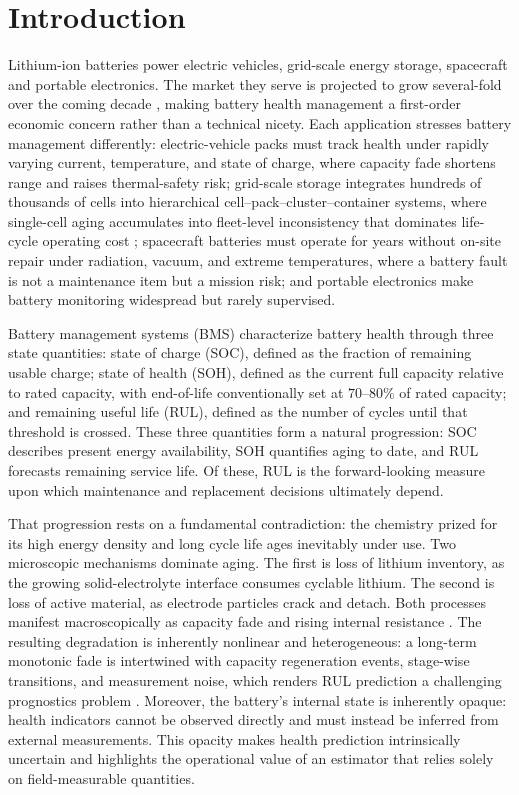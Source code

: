 \documentclass[final,5p,times,twocolumn]{elsarticle}
\begin{document}
\section{Introduction}
\label{sec:intro}

Lithium-ion batteries power electric vehicles, grid-scale energy storage,
 spacecraft and portable electronics. The market they serve is projected 
 to grow several-fold over the coming decade
\cite{ref_yang_review}, making battery health
management a first-order economic concern rather than a technical
nicety. Each application stresses battery management differently:
electric-vehicle packs must track health under rapidly varying
current, temperature, and state of charge, where capacity fade
shortens range and raises thermal-safety risk; grid-scale storage
integrates hundreds of thousands of cells into hierarchical
cell--pack--cluster--container systems, where single-cell aging
accumulates into fleet-level inconsistency that dominates life-cycle
operating cost \cite{ref_qu_bess}; spacecraft batteries must operate
for years without on-site repair under radiation, vacuum, and
extreme temperatures, where a battery fault is not a maintenance
item but a mission risk; and portable electronics
make battery monitoring widespread but rarely supervised.

Battery management systems (BMS) characterize battery health through three state quantities: 
state of charge (SOC), defined as the fraction of remaining usable charge; 
state of health (SOH), defined as the current full capacity relative to rated capacity, 
with end-of-life conventionally set at $70$--$80\%$ of rated capacity; and remaining useful life (RUL),
defined as the number of cycles until that threshold is crossed. 
These three quantities form a natural progression: SOC describes present energy availability, 
SOH quantifies aging to date, and RUL forecasts remaining service life. 
Of these, RUL is the forward-looking measure upon which maintenance and 
replacement decisions ultimately depend.

That progression rests on a fundamental contradiction: the chemistry
prized for its high energy density and long cycle life ages
inevitably under use. Two microscopic mechanisms dominate aging. 
The first is loss of lithium inventory, as the growing solid-electrolyte interface consumes cyclable lithium. 
The second is loss of active material, as electrode particles crack and detach. 
Both processes manifest macroscopically as capacity fade and rising internal resistance
\cite{ref_yang_review}. The resulting degradation is inherently nonlinear and heterogeneous: 
a long-term monotonic fade is intertwined with capacity regeneration events, stage-wise transitions, 
and measurement noise, which renders RUL prediction a challenging prognostics problem \cite{ref_rulmamba,ref_omnitie}.
Moreover, the battery's internal state is inherently opaque: 
health indicators cannot be observed directly and must instead be inferred from external measurements. 
This opacity makes health prediction intrinsically uncertain and highlights the operational value 
of an estimator that relies solely on field-measurable quantities.
\end{document}
